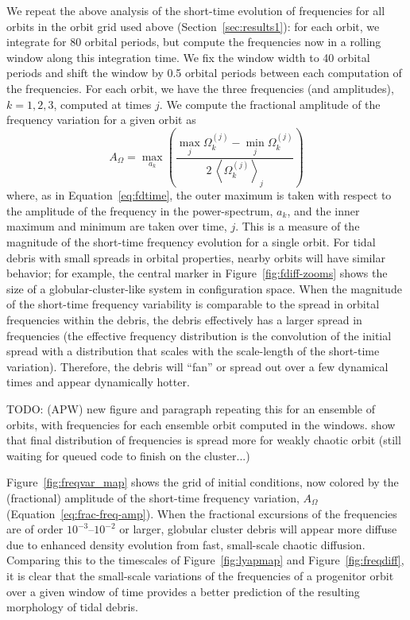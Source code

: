 \documentclass[letterpaper,12pt,preprint]{aastex}
\newcommand{\mean}[1]{\left< #1 \right>}
\newcommand{\todo}[2]{{\color{red} TODO: (\MakeUppercase{#1}) #2}}
\begin{document}
We repeat the above analysis of the short-time evolution of frequencies for all orbits in the orbit grid used above (Section~\ref{sec:results1}): for each orbit, we integrate for 80 orbital periods, but compute the frequencies now in a rolling window along this integration time. We fix the window width to 40 orbital periods and shift the window by 0.5 orbital periods between each computation of the frequencies. For each orbit, we have the three frequencies (and amplitudes), $k=1,2,3$, computed at times $j$. We compute the fractional amplitude of the frequency variation for a given orbit as
\begin{equation}
	A_\Omega = \max_{a_k} \left(\frac{\max_j \Omega^{(j)}_{k} - \min_j \Omega^{(j)}_{k}}{2 \, \mean{\Omega^{(j)}_{k}}_j}\right) \label{eq:frac-freq-amp}
\end{equation}
where, as in Equation~\ref{eq:fdtime}, the outer maximum is taken with respect to the amplitude of the frequency in the power-spectrum, $a_k$, and the inner maximum and minimum are taken over time, $j$. This is a measure of the magnitude of the short-time frequency evolution for a single orbit. For tidal debris with small spreads in orbital properties, nearby orbits will have similar behavior; for example, the central marker in Figure~\ref{fig:fdiff-zooms} shows the size of a globular-cluster-like system in configuration space. When the magnitude of the short-time frequency variability is comparable to the spread in orbital frequencies within the debris, the debris effectively has a larger spread in frequencies (the effective frequency distribution is the convolution of the initial spread with a distribution that scales with the scale-length of the short-time variation). Therefore, the debris will ``fan'' or spread out over a few dynamical times and appear dynamically hotter.

\todo{apw}{new figure and paragraph repeating this for an ensemble of orbits, with frequencies for each ensemble orbit computed in the windows. show that final distribution of frequencies is spread more for weakly chaotic orbit (still waiting for queued code to finish on the cluster...)}

Figure~\ref{fig:freqvar_map} shows the grid of initial conditions, now colored by the (fractional) amplitude of the short-time frequency variation, $A_\Omega$ (Equation~\ref{eq:frac-freq-amp}). When the fractional excursions of the frequencies are of order $10^{-3}$--$10^{-2}$ or larger, globular cluster debris will appear more diffuse due to enhanced density evolution from fast, small-scale chaotic diffusion. Comparing this to the timescales of Figure~\ref{fig:lyapmap} and Figure~\ref{fig:freqdiff}, it is clear that the small-scale variations of the frequencies of a progenitor orbit over a given window of time provides a better prediction of the resulting morphology of tidal debris. 
\end{document}
